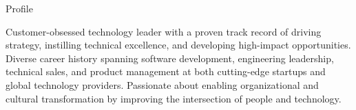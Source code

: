\documentclass{resume} %
\begin{document}
\begin{rSection}{Profile}

    Customer-obsessed technology leader with a proven track record of driving strategy, instilling technical excellence, and developing high-impact opportunities. Diverse career history spanning software development, engineering leadership, technical sales, and product management at both cutting-edge startups and global technology providers. Passionate about enabling organizational and cultural transformation by improving the intersection of people and technology.

\end{rSection}
    
\end{document}
